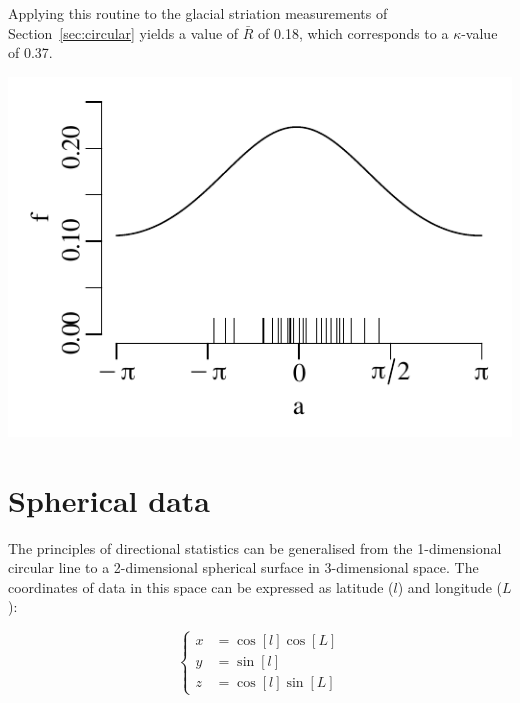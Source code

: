 Applying this routine to the glacial striation measurements of
Section~\ref{sec:circular} yields a value of $\bar{R}$ of 0.18, which
corresponds to a $\kappa$-value of 0.37.

\noindent\begin{minipage}[t][][b]{.4\textwidth}
\includegraphics[width=\textwidth]{../figures/kappastriations.pdf}\\
\end{minipage}
\begin{minipage}[t][][t]{.6\textwidth}
  \label{fig:kappastriations}
\end{minipage}

\section{Spherical data}
\label{sec:spherical-data}

The principles of directional statistics can be generalised from the
1-dimensional circular line to a 2-dimensional spherical surface in
3-dimensional space. The coordinates of data in this space can be
expressed as latitude ($l$) and longitude ($L$):

\begin{equation}
  \left\{
  \begin{split}
    x & = \cos[l]\cos[L]\\
    y & = \sin[l]\\
    z & = \cos[l]\sin[L]
  \end{split}
  \right.
\end{equation}

